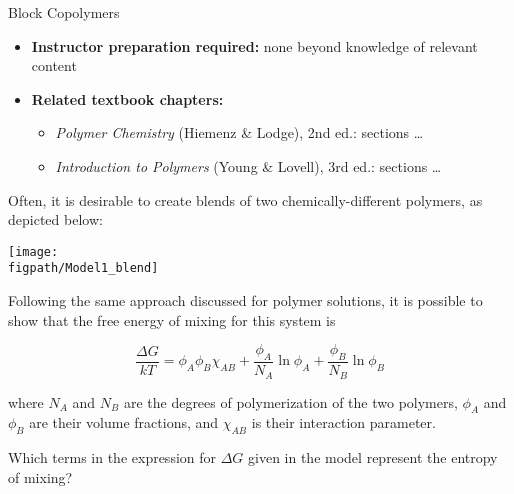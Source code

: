 \begin{activity}[extension]{Block Copolymers}
\begin{instructornotes}
\begin{itemize}
		\item \textbf{Instructor preparation required:} none beyond knowledge of relevant content
		\item \textbf{Related textbook chapters:}
			\begin{itemize}
				\item \emph{Polymer Chemistry} (Hiemenz \& Lodge), 2nd ed.: sections \dots%
				\item \emph{Introduction to Polymers} (Young \& Lovell), 3rd ed.: sections \dots%
		\end{itemize}
	\end{itemize}

\end{instructornotes}


\begin{model}
\label{\labelbase:mdl:polymerblends}

	Often, it is desirable to create blends of two chemically-different polymers, as depicted below:
	
	\vspace{6pt}
	\centerline{\texttt{[image: \\figpath/Model1\_blend]}}
	
	Following the same approach discussed for polymer solutions, it is possible to show that the free energy of mixing for this system is
	
	\begin{equation*}
		\frac{\Delta G}{kT} = \phi_A \phi_B \chi_{AB} + \frac{\phi_A}{N_A}\ln \phi_A + \frac{\phi_B}{N_B}\ln\phi_B
	\end{equation*}
	
	where $N_A$ and $N_B$ are the degrees of polymerization of the two polymers, $\phi_A$ and $\phi_B$ are their volume fractions, and $\chi_{AB}$ is their interaction parameter.

\end{model}

\vspace{0.05in}
\begin{ctqs}

	\question Which terms in the expression for $\Delta G$ given in the model represent the entropy of mixing?
	
		\begin{solution}[0.5in]
		\end{solution}
	

\end{ctqs}
\end{activity}
